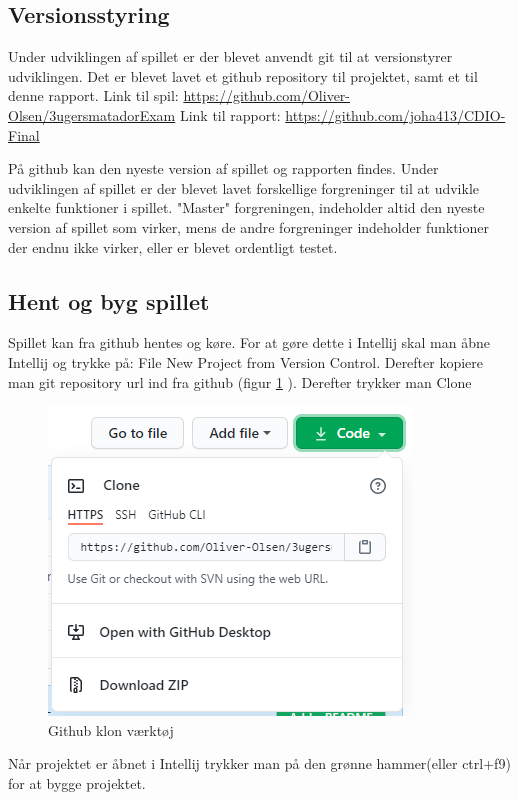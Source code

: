\subsection{Versionsstyring}
Under udviklingen af spillet er der blevet anvendt git til at versionstyrer udviklingen. Det er blevet lavet et github repository til projektet, samt et til denne rapport.
\newline
Link til spil: \url{https://github.com/Oliver-Olsen/3ugersmatadorExam}
\newline
Link til rapport: \url{https://github.com/joha413/CDIO-Final}

På github kan den nyeste version af spillet og rapporten findes. 
Under udviklingen af spillet er der blevet lavet forskellige forgreninger til at udvikle enkelte funktioner i spillet. "Master" forgreningen, indeholder altid den nyeste version af spillet som virker, mens de andre forgreninger indeholder funktioner der endnu ikke virker, eller er blevet ordentligt testet. 

\subsection{Hent og byg spillet}
Spillet kan fra github hentes og køre. For at gøre dette i Intellij skal man åbne Intellij og trykke på: File \textrightarrow New \textrightarrow Project from Version Control. Derefter kopiere man git repository url ind fra github (figur \ref{fig:git} ). Derefter trykker man Clone

\begin{figure}[h]
    \centering
    \includegraphics{sources/git.PNG}
    \caption{Github klon værktøj}
    \label{fig:git}
\end{figure}

Når projektet er åbnet i Intellij trykker man på den grønne hammer(eller ctrl+f9) for at bygge projektet.

